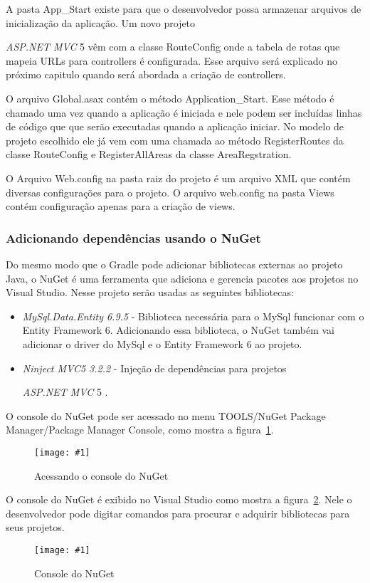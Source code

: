 \documentclass[a4paper,12pt]{article}
\newcommand{\anmvc} {
\sigla{ASP.NET MVC} 5
}
\newcommand{\figura}[3] {
	\begin{figure}[H]
		\centering
		\texttt{[image: \#1]}
		\caption{#2}
		\label{#3}
	\end{figure}
	\FloatBarrier
}
\newcommand{\sigla}[1] {
	\textit{#1}
}
\newcommand{\lib}[1] {
	\textit{#1}
}
\begin{document}
A pasta App\_Start existe para que o desenvolvedor possa armazenar arquivos de inicialização da aplicação. Um novo projeto \anmvc vêm com a classe RouteConfig onde a tabela de rotas que mapeia URLs para controllers é configurada. Esse arquivo será explicado no próximo capitulo quando será abordada a criação de controllers.

O arquivo Global.asax contém o método Application\_Start. Esse método é chamado uma vez quando a aplicação é iniciada e nele podem ser incluídas linhas de código que que serão executadas quando a aplicação iniciar. No modelo de projeto escolhido ele já vem com uma chamada ao método RegisterRoutes da classe RouteConfig e RegisterAllAreas da classe AreaRegstration.

O Arquivo Web.config na pasta raiz do projeto é um arquivo XML que contém diversas configurações para o projeto. O arquivo web.config na pasta Views contém configuração apenas para a criação de views.

\subsubsection{Adicionando dependências usando o NuGet}

Do mesmo modo que o Gradle pode adicionar bibliotecas externas ao projeto Java, o NuGet é uma ferramenta que adiciona e gerencia pacotes aos projetos no Visual Studio. Nesse projeto serão usadas as seguintes bibliotecas:

\begin{itemize}
  \item \lib{MySql.Data.Entity 6.9.5} - Biblioteca necessária para o MySql funcionar com o Entity Framework 6. Adicionando essa biblioteca, o NuGet também vai adicionar o driver do MySql e o Entity Framework 6 ao projeto.
  \item \lib{Ninject MVC5 3.2.2} - Injeção de dependências para projetos \anmvc. 
\end{itemize}

O console do NuGet pode ser acessado no menu TOOLS/NuGet Package Manager/Package Manager Console, como mostra a figura~\ref{fig:20}.

\figura{20.png}{Acessando o console do NuGet}{fig:20}

O console do NuGet é exibido no Visual Studio como mostra a figura~\ref{fig:21}. Nele o desenvolvedor pode digitar comandos para procurar e adquirir bibliotecas para seus projetos.

\figura{21.png}{Console do NuGet}{fig:21}
\end{document}
